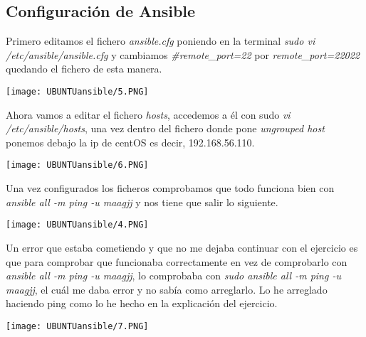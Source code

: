 \documentclass[a4paper, 12pt]{article}
\begin{document}
\subsection{Configuración de Ansible}
\begin{justify}
{Primero editamos el fichero \textit{ansible.cfg} poniendo en la terminal \textit{sudo vi /etc/ansible/ansible.cfg} y cambiamos \textit{\#remote\_port=22} por \textit{remote\_port=22022} quedando el fichero de esta manera. \par}
\end{justify}
\texttt{[image: UBUNTUansible/5.PNG]}
\begin{justify}
{\par Ahora vamos a editar el fichero \textit{hosts}, accedemos a él con sudo \textit{vi /etc/ansible/hosts}, una vez dentro del fichero donde pone \textit{ungrouped host} ponemos debajo la ip de centOS es decir, 192.168.56.110.\par}
\end{justify}
\texttt{[image: UBUNTUansible/6.PNG]}
\begin{justify}
{\par Una vez configurados los ficheros comprobamos que todo funciona bien con \textit{ansible all -m ping -u maagjj} y nos tiene que salir lo siguiente.}
\end{justify}
\texttt{[image: UBUNTUansible/4.PNG]}
\begin{justify}
{Un error que estaba cometiendo y que no me dejaba continuar con el ejercicio es que para comprobar que funcionaba correctamente en vez de comprobarlo con \textit{ansible all -m ping -u maagjj}, lo comprobaba con \textit{sudo ansible all -m ping -u maagjj}, el cuál me daba error y no sabía como arreglarlo. Lo he arreglado haciendo ping como lo he hecho en la explicación del ejercicio.}
\end{justify}
\texttt{[image: UBUNTUansible/7.PNG]}
\end{document}
